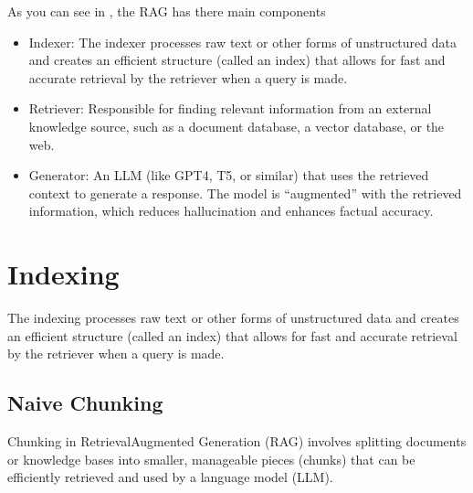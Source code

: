 \documentclass[letterpaper,11pt,english]{sphinxmanual}
\begin{document}
\sphinxAtStartPar
As you can see in {\hyperref[\detokenize{rag:fig-rag}]{}}, the RAG has there main  components
\begin{itemize}
\item {} 
\sphinxAtStartPar
Indexer: The indexer processes raw text or other forms of unstructured data and creates an
efficient structure (called an index) that allows for fast and accurate retrieval
by the retriever when a query is made.

\item {} 
\sphinxAtStartPar
Retriever: Responsible for finding relevant information from an external knowledge source,
such as a document database, a vector database, or the web.

\item {} 
\sphinxAtStartPar
Generator: An LLM (like GPT\sphinxhyphen{}4, T5, or similar) that uses the retrieved context to generate a response.
The model is “augmented” with the retrieved information, which reduces hallucination and enhances factual accuracy.

\end{itemize}


\section{Indexing}
\label{\detokenize{rag:indexing}}
\sphinxAtStartPar
The indexing processes raw text or other forms of unstructured data and creates an efficient structure
(called an index) that allows for fast and accurate retrieval by the retriever when a query is made.

\begin{figure}[htbp]
\centering

\noindent{}
\end{figure}


\subsection{Naive Chunking}
\label{\detokenize{rag:naive-chunking}}
\sphinxAtStartPar
Chunking in Retrieval\sphinxhyphen{}Augmented Generation (RAG) involves splitting documents or knowledge bases
into smaller, manageable pieces (chunks) that can be efficiently retrieved and used by a language model (LLM).
\end{document}
